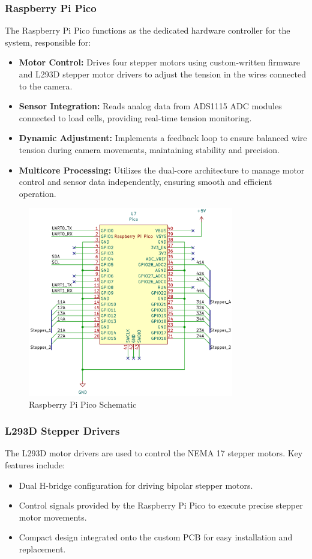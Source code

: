 \subsubsection{Raspberry Pi Pico}
The Raspberry Pi Pico functions as the dedicated hardware controller for the system, responsible for:
\begin{itemize}
    \item \textbf{Motor Control:} Drives four stepper motors using custom-written firmware and L293D stepper motor drivers to adjust the tension in the wires connected to the camera.
    \item \textbf{Sensor Integration:} Reads analog data from ADS1115 ADC modules connected to load cells, providing real-time tension monitoring.
    \item \textbf{Dynamic Adjustment:} Implements a feedback loop to ensure balanced wire tension during camera movements, maintaining stability and precision.
    \item \textbf{Multicore Processing:} Utilizes the dual-core architecture to manage motor control and sensor data independently, ensuring smooth and efficient operation.
\end{itemize}

\begin{figure}[H]
    \centering
    \includegraphics[width=0.8\textwidth]{images/Pico.png}
    \caption{Raspberry Pi Pico Schematic}
    \label{fig:Pico}
\end{figure}

\subsubsection{L293D Stepper Drivers}
The L293D motor drivers are used to control the NEMA 17 stepper motors. Key features include:
\begin{itemize}
    \item Dual H-bridge configuration for driving bipolar stepper motors.
    \item Control signals provided by the Raspberry Pi Pico to execute precise stepper motor movements.
    \item Compact design integrated onto the custom PCB for easy installation and replacement.
\end{itemize}

